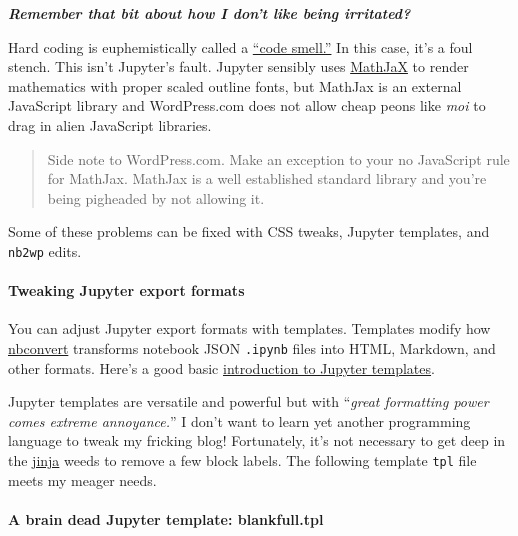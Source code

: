 \textbf{\emph{Remember that bit about how I don't like being
irritated?}}

Hard coding is euphemistically called a
\href{https://www.codegrip.tech/productivity/everything-you-need-to-know-about-code-smells/}{``code
smell.''} In this case, it's a foul stench. This isn't Jupyter's fault.
Jupyter sensibly uses \href{https://www.mathjax.org/}{MathJaX} to render
mathematics with proper scaled outline fonts, but MathJax is an external
JavaScript library and WordPress.com does not allow cheap peons like
\emph{moi} to drag in alien JavaScript libraries.

\begin{quote}
Side note to WordPress.com. Make an exception to your no JavaScript rule
for MathJax. MathJax is a well established standard library and you're
being pigheaded by not allowing it.
\end{quote}

Some of these problems can be fixed with CSS tweaks, Jupyter templates,
and \texttt{nb2wp} edits.

    
    \hypertarget{tweaking-jupyter-export-formats}{%
\paragraph{Tweaking Jupyter export
formats}\label{tweaking-jupyter-export-formats}}

You can adjust Jupyter export formats with templates. Templates modify
how \href{https://nbconvert.readthedocs.io/en/latest/}{nbconvert}
transforms notebook JSON \texttt{.ipynb} files into HTML, Markdown, and
other formats. Here's a good basic
\href{https://nbconvert.readthedocs.io/en/latest/customizing.html}{introduction
to Jupyter templates}.

Jupyter templates are versatile and powerful but with ``\emph{great
formatting power comes extreme annoyance.}'' I don't want to learn yet
another programming language to tweak my fricking blog! Fortunately,
it's not necessary to get deep in the
\href{https://jinja.palletsprojects.com/en/2.11.x/}{jinja} weeds to
remove a few block labels. The following template \texttt{tpl} file
meets my meager needs.

\hypertarget{a-brain-dead-jupyter-template-blankfull.tpl}{%
\paragraph{A brain dead Jupyter template:
blankfull.tpl}\label{a-brain-dead-jupyter-template-blankfull.tpl}}

